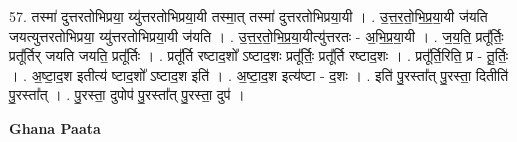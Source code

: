 \documentclass[17pt]{extarticle}
\begin{document}
57. तस्मा॑ दुत्तरतोभिप्रया॒ य्यु॑त्तरतोभिप्रया॒यी तस्मा॒त् तस्मा॑ दुत्तरतोभिप्रया॒यी । . उ॒त्त॒र॒तो॒भि॒प्र॒या॒यी ज॑यति जयत्युत्तरतोभिप्रया॒ य्यु॑त्तरतोभिप्रया॒यी ज॑यति । . उ॒त्त॒र॒तो॒भि॒प्र॒या॒यीत्यु॑त्तरतः - अ॒भि॒प्र॒या॒यी । . ज॒य॒ति॒ प्रतू᳚र्तिः॒ प्रतू᳚र्तिर् जयति जयति॒ प्रतू᳚र्तिः । . प्रतू᳚र्ति रष्टाद॒शो᳚ ऽष्टाद॒शः प्रतू᳚र्तिः॒ प्रतू᳚र्ति रष्टाद॒शः । . प्रतू᳚र्ति॒रिति॒ प्र - तू॒र्तिः॒ । . अ॒ष्टा॒द॒श इतीत्य॑ ष्टाद॒शो᳚ ऽष्टाद॒श इति॑ । . अ॒ष्टा॒द॒श इत्य॑ष्टा - द॒शः । . इति॑ पु॒रस्ता᳚त् पु॒रस्ता॒ दितीति॑ पु॒रस्ता᳚त् । . पु॒रस्ता॒ दुपोप॑ पु॒रस्ता᳚त् पु॒रस्ता॒ दुप॑ । \newline

\textbf{Ghana Paata } \newline
\end{document}
